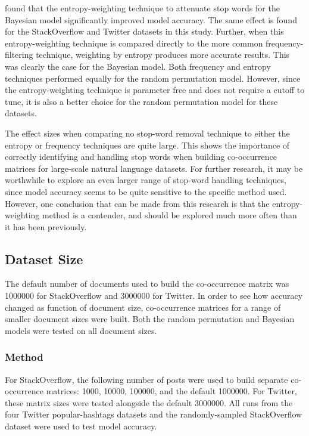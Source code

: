 \documentclass[man,floatsintext,donotrepeattitle]{apa6}
\begin{document}
\textcite{Stanley2013} found that the entropy-weighting technique to attenuate stop words for the Bayesian model significantly improved model accuracy.
The same effect is found for the StackOverflow and Twitter datasets in this study.
Further, when this entropy-weighting technique is compared directly to the more common frequency-filtering technique, weighting by entropy produces more accurate results.
This was clearly the case for the Bayesian model.
Both frequency and entropy techniques performed equally for the random permutation model.
However, since the entropy-weighting technique is parameter free and does not require a cutoff to tune, it is also a better choice for the random permutation model for these datasets.

The effect sizes when comparing no stop-word removal technique to either the entropy or frequency techniques are quite large.
This shows the importance of correctly identifying and handling stop words when building co-occurrence matrices for large-scale natural language datasets.
For further research, it may be worthwhile to explore an even larger range of stop-word handling techniques,
since model accuracy seems to be quite sensitive to the specific method used. 
However, one conclusion that can be made from this research is that the entropy-weighting method is a contender, and should be explored much more often than it has been previously.

\subsection{Dataset Size}

The default number of documents used to build the co-occurrence matrix was \num{1000000} for StackOverflow and \num{3000000} for Twitter.
In order to see how accuracy changed as function of document size, 
co-occurrence matrices for a range of smaller document sizes were built.
Both the random permutation and Bayesian models were tested on all document sizes.

\subsubsection{Method}

For StackOverflow, the following number of posts were used to build separate co-occurrence matrices: \num{1000}, \num{10000}, \num{100000}, and the default \num{1000000}.
For Twitter, these matrix sizes were tested alongside the default \num{3000000}.
All runs from the four Twitter popular-hashtags datasets and the randomly-sampled StackOverflow dataset were used to test model accuracy.
\end{document}
